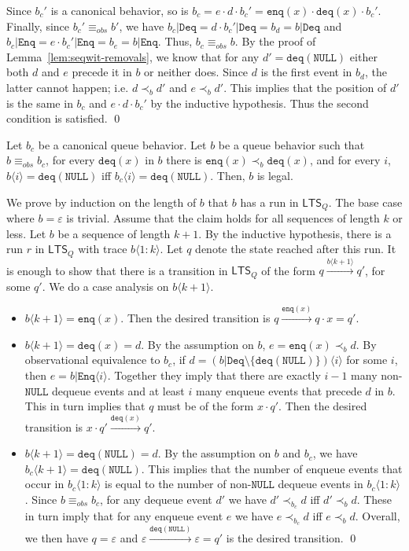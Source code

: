 \documentclass{LMCS}
\newcommand{\NULL}{\ensuremath{\mathtt{NULL}}}
\newcommand{\enq}{\ensuremath{\mathtt{enq}}}
\newcommand{\deq}{\ensuremath{\mathtt{deq}}}
\newcommand{\ltsq}{\ensuremath{{\mathsf{LTS}}_Q}}
\newcommand{\qtrans}[1]{\ensuremath{\xrightarrow{#1}}}
\newcommand{\seqx}[2]{\ensuremath{#1\langle #2\rangle}}
\newcommand{\enqset}{\ensuremath{\mathtt{Enq}}}
\newcommand{\deqset}{\ensuremath{\mathtt{Deq}}}
\newcommand{\obsequiv}{\ensuremath{\equiv_{\mathit{obs}}}}
\newcommand\mylabel[1]{\label{#1}}
\begin{document}
\begin{itemize}
Since $b_c'$ is a canonical behavior, so is $b_c=e\cdot d\cdot b_c'=\enq(x)\cdot \deq(x)\cdot b_c'$.
Finally, since $b_c'\obsequiv b'$, we have $b_c|\deqset=d\cdot b_c'|\deqset=b_d=b|\deqset$ and $b_c|\enqset=e\cdot b_c'|\enqset=b_e=b|\enqset$. 
Thus, $b_c\obsequiv b$.
By the proof of Lemma~\ref{lem:seqwit-removals}, we know that for any $d'=\deq(\NULL)$ either both $d$ and $e$ precede it in $b$ or neither does.
Since $d$ is the first event in $b_d$, the latter cannot happen; i.e. $d\prec_b d'$ and $e\prec_b d'$.
This implies that the position of $d'$ is the same in $b_c$ and $e\cdot d\cdot b_c'$ by the inductive hypothesis.
Thus the second condition is satisfied. 
\qed
\end{itemize}

\begin{lem}\mylabel{lem:canonical-order-legal}
Let $b_c$ be a canonical queue behavior.
Let $b$ be a queue behavior such that $b\obsequiv b_c$, 
for every $\deq(x)$ in $b$ there is $\enq(x)\prec_b \deq(x)$, and 
for every $i$, $\seqx b {i}=\deq(\NULL)$ iff $\seqx {b_c} {i}=\deq(\NULL)$.
Then, $b$ is legal.
\end{lem}
\proof
We prove by induction on the length of $b$ that $b$ has a run in {\ltsq}.
The base case where $b=\varepsilon$ is trivial.
Assume that the claim holds for all sequences of length $k$ or less.
Let $b$ be a sequence of length $k+1$.
By the inductive hypothesis, there is a run $r$ in {\ltsq} with trace $\seqx b {1:k}$.
Let $q$ denote the state reached after this run.
It is enough to show that there is a transition in {\ltsq} of the form $q\qtrans{\seqx b {k+1}}q'$, for some $q'$.
We do a case analysis on $\seqx b {k+1}$.
\begin{itemize}
\item $\seqx b {k+1}=\enq(x)$. 
Then the desired transition is $q\qtrans{\enq(x)}q\cdot x=q'$.
\item $\seqx b {k+1}=\deq(x)=d$.
By the assumption on $b$, $e=\enq(x)\prec_b d$.
By observational equivalence to $b_c$, if $d=\seqx {(b|\deqset\setminus\{\deq(\NULL)\})} {i}$ for some $i$, then $e=\seqx {b|\enqset} {i}$.
Together they imply that there are exactly $i-1$ many non-{\NULL} dequeue events and at least $i$ many enqueue events that precede $d$ in $b$.
This in turn implies that $q$ must be of the form $x\cdot q'$.
Then the desired transition is $x\cdot q'\qtrans{\deq(x)}q'$.
\item $\seqx b {k+1}=\deq(\NULL)=d$.
By the assumption on $b$ and $b_c$, we have $\seqx {b_c} {k+1}=\deq(\NULL)$.
This implies that the number of enqueue events that occur in $\seqx {b_c} {1:k}$ is equal to the number of non-{\NULL} dequeue events in $\seqx {b_c} {1:k}$.
Since $b\obsequiv b_c$, for any dequeue event $d'$ we have $d'\prec_{b_c} d$ iff $d'\prec_b d$.
These in turn imply that for any enqueue event $e$ we have $e\prec_{b_c} d$ iff $e\prec_b d$.
Overall, we then have $q=\varepsilon$ and $\varepsilon\qtrans{\deq(\NULL)}\varepsilon=q'$ is the desired transition.
\qed
\end{itemize}
\end{document}

